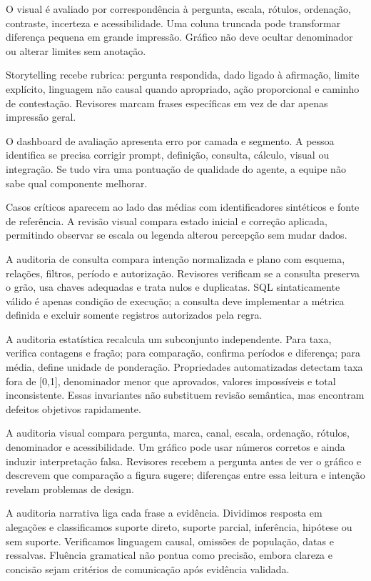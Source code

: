 O visual é avaliado por correspondência à pergunta, escala, rótulos, ordenação, contraste, incerteza e acessibilidade. Uma coluna truncada pode transformar diferença pequena em grande impressão. Gráfico não deve ocultar denominador ou alterar limites sem anotação.

Storytelling recebe rubrica: pergunta respondida, dado ligado à afirmação, limite explícito, linguagem não causal quando apropriado, ação proporcional e caminho de contestação. Revisores marcam frases específicas em vez de dar apenas impressão geral.

O dashboard de avaliação apresenta erro por camada e segmento. A pessoa identifica se precisa corrigir prompt, definição, consulta, cálculo, visual ou integração. Se tudo vira uma pontuação de qualidade do agente, a equipe não sabe qual componente melhorar.

Casos críticos aparecem ao lado das médias com identificadores sintéticos e fonte de referência. A revisão visual compara estado inicial e correção aplicada, permitindo observar se escala ou legenda alterou percepção sem mudar dados.

A auditoria de consulta compara intenção normalizada e plano com esquema, relações, filtros, período e autorização. Revisores verificam se a consulta preserva o grão, usa chaves adequadas e trata nulos e duplicatas. SQL sintaticamente válido é apenas condição de execução; a consulta deve implementar a métrica definida e excluir somente registros autorizados pela regra.

A auditoria estatística recalcula um subconjunto independente. Para taxa, verifica contagens e fração; para comparação, confirma períodos e diferença; para média, define unidade de ponderação. Propriedades automatizadas detectam taxa fora de [0,1], denominador menor que aprovados, valores impossíveis e total inconsistente. Essas invariantes não substituem revisão semântica, mas encontram defeitos objetivos rapidamente.

A auditoria visual compara pergunta, marca, canal, escala, ordenação, rótulos, denominador e acessibilidade. Um gráfico pode usar números corretos e ainda induzir interpretação falsa. Revisores recebem a pergunta antes de ver o gráfico e descrevem que comparação a figura sugere; diferenças entre essa leitura e intenção revelam problemas de design.

A auditoria narrativa liga cada frase a evidência. Dividimos resposta em alegações e classificamos suporte direto, suporte parcial, inferência, hipótese ou sem suporte. Verificamos linguagem causal, omissões de população, datas e ressalvas. Fluência gramatical não pontua como precisão, embora clareza e concisão sejam critérios de comunicação após evidência validada.

